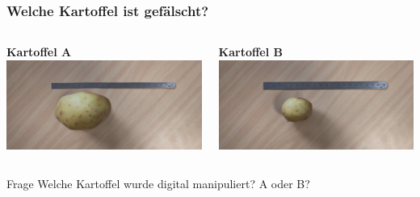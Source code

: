 \documentclass[11pt,t,usepdftitle=false,aspectratio=169]{beamer}
\begin{document}
\begin{frame}
	\frametitle{Welche Kartoffel ist gefälscht?}
	\begin{columns}[T]
		\begin{column}{0.48\textwidth}
			\centering
			\textbf{Kartoffel A}
			\vspace{0.5em}
			\includegraphics[width=\textwidth]{images/image_2_s.jpg}
		\end{column}
		\begin{column}{0.48\textwidth}
			\centering
			\textbf{Kartoffel B}
			\vspace{0.5em}
			\includegraphics[width=\textwidth]{images/image_2_s2.jpg}
		\end{column}
	\end{columns}
	
	\vspace{2em}
	\begin{alertblock}{Frage}
		Welche Kartoffel wurde digital manipuliert? A oder B?
	\end{alertblock}
\end{frame}
\end{document}
